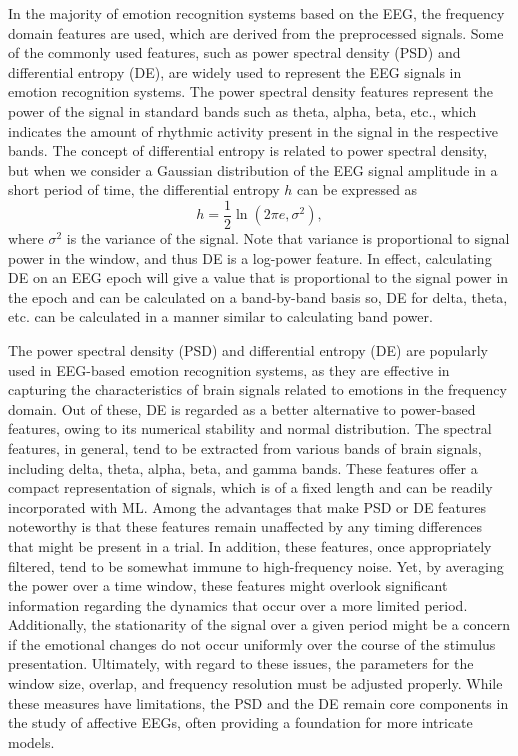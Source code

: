 \documentclass{WileyMSP-template}
\begin{document}
In the majority of emotion recognition systems based on the EEG, the frequency domain features are used, which are derived from the preprocessed signals. Some of the commonly used features, such as power spectral density (PSD) and differential entropy (DE), are widely used to represent the EEG signals in emotion recognition systems. The power spectral density features represent the power of the signal in standard bands such as theta, alpha, beta, etc., which indicates the amount of rhythmic activity present in the signal in the respective bands. The concept of differential entropy is related to power spectral density, but when we consider a Gaussian distribution of the EEG signal amplitude in a short period of time, the differential entropy $h$ can be expressed as
\begin{equation}
    h = \frac{1}{2}\ln(2\pi e,\sigma^2), 
\end{equation}
where $\sigma^2$ is the variance of the signal. Note that variance is proportional to signal power in the window, and thus DE is a log-power feature. In effect, calculating DE on an EEG epoch will give a value that is proportional to the signal power in the epoch and can be calculated on a band-by-band basis so, DE for delta, theta, etc. can be calculated in a manner similar to calculating band power.

The power spectral density (PSD) and differential entropy (DE) are popularly used in EEG-based emotion recognition systems, as they are effective in capturing the characteristics of brain signals related to emotions in the frequency domain. Out of these, DE is regarded as a better alternative to power-based features, owing to its numerical stability and normal distribution. The spectral features, in general, tend to be extracted from various bands of brain signals, including delta, theta, alpha, beta, and gamma bands. These features offer a compact representation of signals, which is of a fixed length and can be readily incorporated with ML. Among the advantages that make PSD or DE features noteworthy is that these features remain unaffected by any timing differences that might be present in a trial. In addition, these features, once appropriately filtered, tend to be somewhat immune to high-frequency noise. Yet, by averaging the power over a time window, these features might overlook significant information regarding the dynamics that occur over a more limited period. Additionally, the stationarity of the signal over a given period might be a concern if the emotional changes do not occur uniformly over the course of the stimulus presentation. Ultimately, with regard to these issues, the parameters for the window size, overlap, and frequency resolution must be adjusted properly. While these measures have limitations, the PSD and the DE remain core components in the study of affective EEGs, often providing a foundation for more intricate models.
\end{document}
